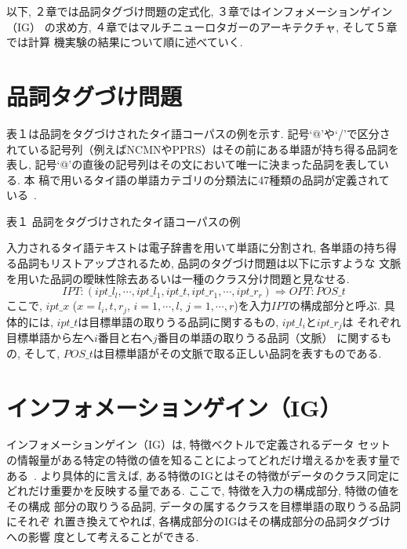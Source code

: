 以下, ２章では品詞タグづけ問題の定式化, ３章ではインフォメーションゲイン
（IG）
の求め方,  ４章ではマルチニューロタガーのアーキテクチャ, そして５章では計算
機実験の結果について順に述べていく.

\section{品詞タグづけ問題}
表１は品詞をタグづけされたタイ語コーパスの例を示す. 記号`@'や`/'で区分さ
れている記号列（例えばNCMNやPPRS）はその前にある単語が持ち得る品詞を表し, 
記号`@'の直後の記号列はその文において唯一に決まった品詞を表している. 本
稿で用いるタイ語の単語カテゴリの分類法に47種類の品詞が定義されて
いる~\cite{charoenporn}.

\begin{table*}
\begin{center}
表１ 品詞をタグづけされたタイ語コーパスの例 \\[2mm]
\smallskip
{}
\end{center}
\end{table*}

入力されるタイ語テキストは電子辞書を用いて単語に分割され, 各単語の持ち得
る品詞もリストアップされるため, 品詞のタグづけ問題は以下に示すような
文脈を用いた品詞の曖昧性除去あるいは一種のクラス分け問題と見なせる.
\begin{equation}
IPT: (ipt\_l_{l},\cdots,ipt\_l_{1}, ipt\_t, ipt\_r_{1}, \cdots,
ipt\_r_{r}) \Rightarrow OPT: POS\_t
\end{equation}
ここで, $ipt\_x$ ($x=l_{i}, t, r_{j}$, $i=1, \cdots, l$, $j=1, \cdots,
r$)を入力$IPT$の構成部分と呼ぶ. 具体的には,
$ipt\_t$は目標単語の取りうる品詞に関するもの,
$ipt\_l_{i}$と$ipt\_r_{j}$は
それぞれ目標単語から左へ$i$番目と右へ$j$番目の単語の取りうる品詞（文脈）
に関するもの,
そして, $POS\_t$は目標単語がその文脈で取る正しい品詞を表すものである.

\section{インフォメーションゲイン（IG）}
インフォメーションゲイン（IG）は, 特徴ベクトルで定義されるデータ
セットの情報量がある特定の特徴の値を知ることによってどれだけ増えるかを表す量である~\cite{daelemans:92,quinlan}. より具体的に言えば, 
ある特徴のIGとはその特徴がデータのクラス同定にどれだけ重要かを反映する量である.  
ここで, 特徴を入力の構成部分, 特徴の値をその構成
部分の取りうる品詞, データの属するクラスを目標単語の取りうる品詞にそれぞ
れ置き換えてやれば,
各構成部分のIGはその構成部分の品詞タグづけへの影響
度として考えることができる. 


